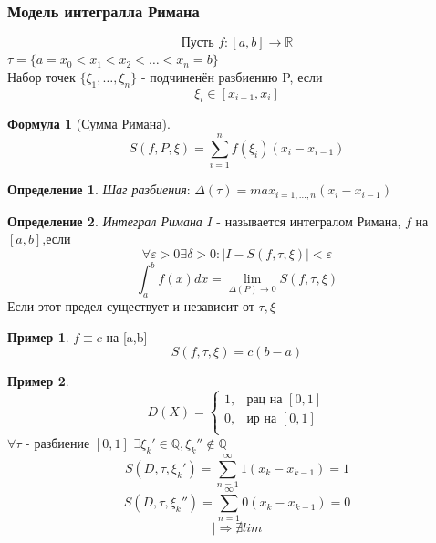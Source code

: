 \documentclass[a4paper]{article}
\theoremstyle{definition}
\newtheorem*{definition*}{Определение}
\newtheorem*{exmp}{Пример}
\newtheorem*{formula}{Формула}
\newcommand\abs[1]{%
\mbox{$| #1 |$}}
\newcommand\InAll[0]{%
|\Rightarrow}
\numberwithin{theorem}{subsection}
\numberwithin{lemma}{subsection}
\numberwithin{definition}{subsection}
\numberwithin{comment*}{subsection}
\numberwithin{consequence}{subsection}
\numberwithin{property}{subsection}
\begin{document}
\subsubsection{Модель интегралла Римана}
$$\text{Пусть } f:[a,b] \rightarrow \mathbb{R}$$
$ \tau = \{ a= x_0 <x_1 < x_2< \dots < x_n = b \} $\\
Набор точек $\{ \xi_1, \dots ,\xi_n \}$ - подчиненён разбиению P, если $$ \xi_i\in[x_{i-1}, x_i] $$
\begin{formula}[Сумма Римана]
 $$ S(f, P, \xi)=\sum_{i=1}^{n}{f(\xi_i)(x_i-x_{i-1})} $$
\end{formula}
\begin{definition*}
 \textit{Шаг разбиения}: $\Delta(\tau) = max_{i=1, \dots,n} (x_i - x_{i-1})$
\end{definition*}
\begin{definition*}
 \textit{Интеграл Римана}
 $I$ - называется интегралом Римана,  $f$ на $[a,b]$,если
 $$ \forall{\varepsilon}>0 \exists{\delta}>0: \abs{I-S(f, \tau, \xi)}<\varepsilon $$
 $$ \int_a^b f(x)  dx = \lim_{\Delta(P) \rightarrow 0}{S(f,\tau,\xi)} $$
 Если этот предел существует и независит от $\tau, \xi$
\end{definition*}
\begin{exmp}
 $f \equiv c $ на [a,b]
 $$ S(f, \tau, \xi) = c(b-a) $$
\end{exmp}
\begin{exmp}
 $$D(X) = \begin{cases}
   1, & \text{рац на }[0,1] \\
   0, & \text{ир на }[0,1]  \\
  \end{cases}$$
 $\forall{\tau} $ - разбиение $[0,1]$ $\exists{\xi_k' }\in \mathbb{Q}, \xi_k''  \notin \mathbb{Q} $
 $$S(D, \tau, \xi_k'  ) = \sum_{n=1}^{\infty}{1(x_k - x_{k-1})} = 1$$
 $$S(D, \tau, \xi_k'' ) = \sum_{n=1}^{\infty}{0(x_k - x_{k-1})} = 0 $$
 $$ \InAll \nexists lim $$
\end{exmp}
\end{document}
